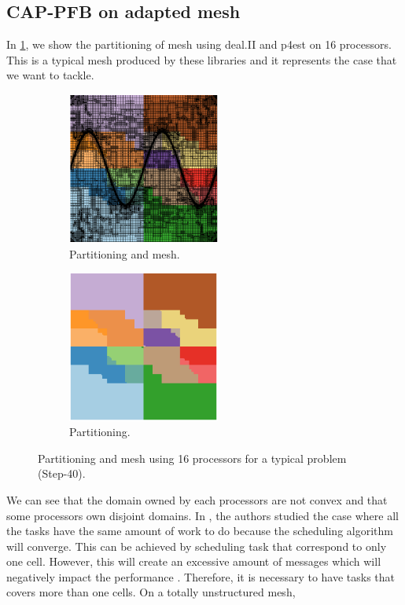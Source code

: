 \documentclass[letterpaper]{article}
\renewcommand{\(}{\left(}
\renewcommand{\)}{\right)}
\renewcommand{\[}{\left[}
\renewcommand{\]}{\right]}
\begin{document}
\subsection{CAP-PFB on adapted mesh}
In \cref{subdomain_id}, we show the partitioning of mesh using deal.II \cite{} and
p4est \cite{} on 16 processors. This is a typical mesh produced by these
libraries and it represents the case that we want to tackle. 
\begin{figure}[H]
  \begin{subfigure}[b]{.5\textwidth}
    \centering
    \includegraphics[width=5cm]{subdomain_id_0}
    \caption{Partitioning and mesh.}
  \end{subfigure}
  \begin{subfigure}[b]{.5\textwidth}
    \centering
    \includegraphics[width=5cm]{subdomain_id_1}
    \caption{Partitioning.}
  \end{subfigure}
  \caption{Partitioning and mesh using 16 processors for a typical problem
  (Step-40).}
  \label{subdomain_id}
\end{figure}
We can see that the domain owned by each processors are not convex and that some
processors own disjoint domains. In \cite{Mo2014}, the authors studied the case
where all the tasks have the same amount of work to do because the scheduling
algorithm will converge. This can be achieved by scheduling task that correspond
to only one cell. However, this will create an excessive amount of messages
which will negatively impact the performance \cite{}. Therefore, it is necessary
to have tasks that covers more than one cells. On a totally unstructured mesh,
\end{document}
